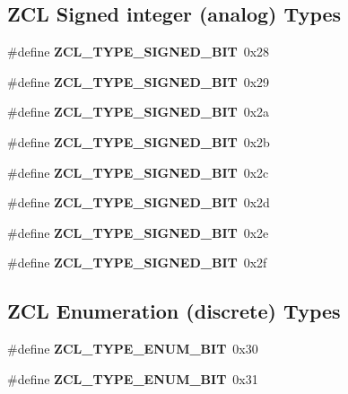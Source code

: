 \subsection*{Z\+CL Signed integer (analog) Types}
\begin{DoxyCompactItemize}
\item 
\mbox{\label{group__zcl__types_ga8df1144075b3c768717e38f750ff4d2d}} 
\#define {\bfseries Z\+C\+L\+\_\+\+T\+Y\+P\+E\+\_\+\+S\+I\+G\+N\+E\+D\+\_\+B\+IT}~0x28
\item 
\mbox{\label{group__zcl__types_ga8ee8ec849fb738d70b81ce4b4af8ea93}} 
\#define {\bfseries Z\+C\+L\+\_\+\+T\+Y\+P\+E\+\_\+\+S\+I\+G\+N\+E\+D\+\_\+B\+IT}~0x29
\item 
\mbox{\label{group__zcl__types_ga5d2c6473dec5ef0620e49a064e1b5040}} 
\#define {\bfseries Z\+C\+L\+\_\+\+T\+Y\+P\+E\+\_\+\+S\+I\+G\+N\+E\+D\+\_\+B\+IT}~0x2a
\item 
\mbox{\label{group__zcl__types_gadb5ed867f966c7d280a59abd421004a9}} 
\#define {\bfseries Z\+C\+L\+\_\+\+T\+Y\+P\+E\+\_\+\+S\+I\+G\+N\+E\+D\+\_\+B\+IT}~0x2b
\item 
\mbox{\label{group__zcl__types_ga194ccd242604887fbaa41cd427088643}} 
\#define {\bfseries Z\+C\+L\+\_\+\+T\+Y\+P\+E\+\_\+\+S\+I\+G\+N\+E\+D\+\_\+B\+IT}~0x2c
\item 
\mbox{\label{group__zcl__types_gad6d48bb79a8dc729807f137924d26920}} 
\#define {\bfseries Z\+C\+L\+\_\+\+T\+Y\+P\+E\+\_\+\+S\+I\+G\+N\+E\+D\+\_\+B\+IT}~0x2d
\item 
\mbox{\label{group__zcl__types_ga56a4716c3e4b5e8fd3b9bc4d944c5533}} 
\#define {\bfseries Z\+C\+L\+\_\+\+T\+Y\+P\+E\+\_\+\+S\+I\+G\+N\+E\+D\+\_\+B\+IT}~0x2e
\item 
\mbox{\label{group__zcl__types_ga05040382bcbb409fdc93d7130057e3c6}} 
\#define {\bfseries Z\+C\+L\+\_\+\+T\+Y\+P\+E\+\_\+\+S\+I\+G\+N\+E\+D\+\_\+B\+IT}~0x2f
\end{DoxyCompactItemize}
\subsection*{Z\+CL Enumeration (discrete) Types}
\begin{DoxyCompactItemize}
\item 
\mbox{\label{group__zcl__types_ga941ea2cc51c3a17d4ae9e095ae3a864f}} 
\#define {\bfseries Z\+C\+L\+\_\+\+T\+Y\+P\+E\+\_\+\+E\+N\+U\+M\+\_\+B\+IT}~0x30
\item 
\mbox{\label{group__zcl__types_ga6688181319502f973473d2cdf17e6260}} 
\#define {\bfseries Z\+C\+L\+\_\+\+T\+Y\+P\+E\+\_\+\+E\+N\+U\+M\+\_\+B\+IT}~0x31
\end{DoxyCompactItemize}

